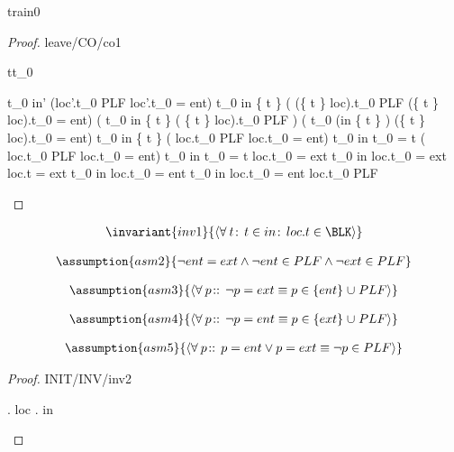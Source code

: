 \documentclass[12pt]{amsart}
\begin{document}
\begin{machine}{train0}
\begin{proof}{leave/CO/co1}
	\begin{free:var}{t}{t_0}
	\begin{calculation}
		t_0 \in in' \land (loc'.t_0 \in PLF \lor loc'.t_0 = ent)
		t_0 \in in \setminus \{ t \} 
		\land ( (\{ t \} \domsub loc).t_0 \in PLF \lor (\{ t \} \domsub loc).t_0 = ent)
	\hint{=}{ }	%
		( t_0 \in in \setminus \{ t \} 
		\land  ( \{ t \} \domsub loc).t_0 \in PLF )
			   \lor ( t_0 \in (in \setminus \{ t \} )
		\land (\{ t \} \domsub loc).t_0 = ent)
	\hint{=}{ \ref{inv2} }	%
			t_0 \in in \setminus \{ t \} 
		\land ( loc.t_0 \in PLF \lor  loc.t_0 = ent)
	\hint{=}{ } %
		t_0 \in in \land \neg t_0  = t 
		\land ( loc.t_0 \in PLF \lor  loc.t_0 = ent)
	\hint{=}{  } %
		t_0 \in in \land \neg t_0  = t \land \neg loc.t_0 = ext
	\hint{=}{  \ref{grd0} } %
	 	t_0 \in in \land \neg loc.t_0 = ext \land loc.t = ext
	\hint{\follows}{  \ref{grd0} } %
	 	t_0 \in in \land loc.t_0 = ent 
	\hint{=}{   } %
	 	t_0 \in in \land loc.t_0 = ent  \land \neg loc.t_0 \in PLF 
	\end{calculation}
	\end{free:var}
\end{proof}

\begin{align*}
\invariant{inv1}
{	\qforall{t}{t \in in}{loc.t \in \BLK}	}
\end{align*}

\begin{align*}
\assumption{asm2}
{	\neg ent = ext \land \neg ent \in PLF \land \neg ext \in PLF	}
\end{align*}

\begin{align*}
\assumption{asm3}
{	\qforall{p}{}{ \neg p = ext \equiv p \in \{ent\} \bunion PLF }	}
\end{align*}

\begin{align*}
\assumption{asm4}
{	\qforall{p}{}{ \neg p = ent \equiv p \in \{ext\} \bunion PLF }	}
\end{align*}

\begin{align*}
\assumption{asm5}
{	\qforall{p}{}{ p = ent \lor p = ext \equiv \neg p \in PLF }	}
\end{align*}

\begin{proof}{INIT/INV/inv2}
	\begin{calculation}
		\dom. loc
	\hint{=}{ \ref{in1} }
		 \dom . \oftype{ \emptyfun }{ \pfun[\TRAIN, \BLK] }  
	\hint{=}{ empty functions }
		\oftype{ \emptyset }{\set[\TRAIN]}
	\hint{=}{ \ref{in0} }
		in
	\end{calculation}
\end{proof}


\end{machine}
\end{document}
